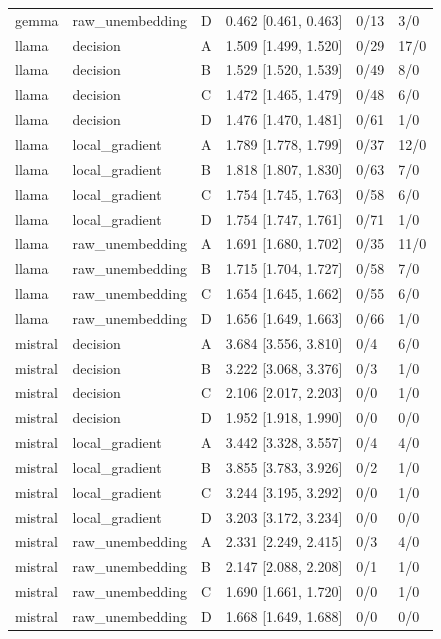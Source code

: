 \begin{tabular}{llllll}
gemma & raw\_unembedding & D & 0.462 [0.461, 0.463] & 0/13 & 3/0 \\
llama & decision & A & 1.509 [1.499, 1.520] & 0/29 & 17/0 \\
llama & decision & B & 1.529 [1.520, 1.539] & 0/49 & 8/0 \\
llama & decision & C & 1.472 [1.465, 1.479] & 0/48 & 6/0 \\
llama & decision & D & 1.476 [1.470, 1.481] & 0/61 & 1/0 \\
llama & local\_gradient & A & 1.789 [1.778, 1.799] & 0/37 & 12/0 \\
llama & local\_gradient & B & 1.818 [1.807, 1.830] & 0/63 & 7/0 \\
llama & local\_gradient & C & 1.754 [1.745, 1.763] & 0/58 & 6/0 \\
llama & local\_gradient & D & 1.754 [1.747, 1.761] & 0/71 & 1/0 \\
llama & raw\_unembedding & A & 1.691 [1.680, 1.702] & 0/35 & 11/0 \\
llama & raw\_unembedding & B & 1.715 [1.704, 1.727] & 0/58 & 7/0 \\
llama & raw\_unembedding & C & 1.654 [1.645, 1.662] & 0/55 & 6/0 \\
llama & raw\_unembedding & D & 1.656 [1.649, 1.663] & 0/66 & 1/0 \\
mistral & decision & A & 3.684 [3.556, 3.810] & 0/4 & 6/0 \\
mistral & decision & B & 3.222 [3.068, 3.376] & 0/3 & 1/0 \\
mistral & decision & C & 2.106 [2.017, 2.203] & 0/0 & 1/0 \\
mistral & decision & D & 1.952 [1.918, 1.990] & 0/0 & 0/0 \\
mistral & local\_gradient & A & 3.442 [3.328, 3.557] & 0/4 & 4/0 \\
mistral & local\_gradient & B & 3.855 [3.783, 3.926] & 0/2 & 1/0 \\
mistral & local\_gradient & C & 3.244 [3.195, 3.292] & 0/0 & 1/0 \\
mistral & local\_gradient & D & 3.203 [3.172, 3.234] & 0/0 & 0/0 \\
mistral & raw\_unembedding & A & 2.331 [2.249, 2.415] & 0/3 & 4/0 \\
mistral & raw\_unembedding & B & 2.147 [2.088, 2.208] & 0/1 & 1/0 \\
mistral & raw\_unembedding & C & 1.690 [1.661, 1.720] & 0/0 & 1/0 \\
mistral & raw\_unembedding & D & 1.668 [1.649, 1.688] & 0/0 & 0/0 \\

\end{tabular}
